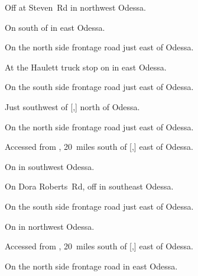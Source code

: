 

\begin{LocationList}

Off  at Steven~Rd in northwest Odessa.

On  south of  in east Odessa.

\Location{\GarageHQ \Garage}
On the north side  frontage road just east of Odessa.

At the Haulett truck stop on  in east Odessa.

On the south side  frontage road just east of Odessa.

Just southwest of [,] north of Odessa.

On the north side  frontage road just east of Odessa.

Accessed from , 20~miles south of [,] east of Odessa.

On  in southwest Odessa.

On  Dora Roberts~Rd, off  in southeast Odessa.

On the south side  frontage road just east of Odessa.

On  in northwest Odessa.

Accessed from , 20~miles south of [,] east of Odessa.

On the north side  frontage road in east Odessa.

\end{LocationList}

